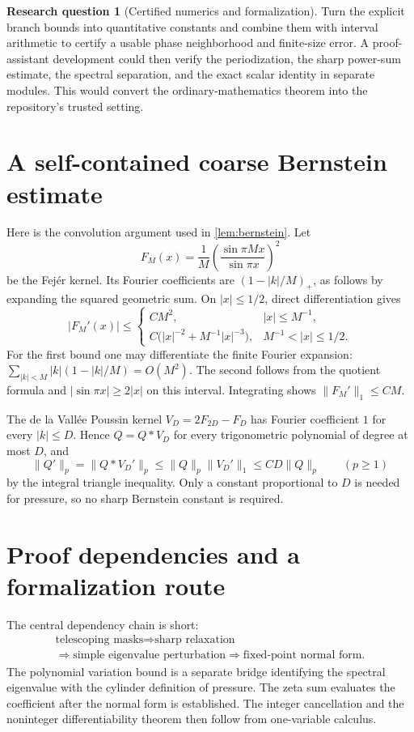 \documentclass[11pt,a4paper]{article}
\numberwithin{equation}{section}
\theoremstyle{definition}
\newtheorem{question}{Research question}
\theoremstyle{remark}
\begin{document}
\begin{question}[Certified numerics and formalization]
Turn the explicit branch bounds into quantitative constants and combine
them with interval arithmetic to certify a usable phase neighborhood and
finite-size error. A proof-assistant development could then verify the
periodization, the sharp power-sum estimate, the spectral separation,
and the exact scalar identity in separate modules. This would convert
the ordinary-mathematics theorem into the repository's trusted setting.
\end{question}

\appendix
\section{A self-contained coarse Bernstein estimate}
\label{app:bernstein}
Here is the convolution argument used in \cref{lem:bernstein}. Let
\[
 F_M(x)=\frac1M\left(\frac{\sin\pi Mx}{\sin\pi x}\right)^2
\]
be the Fej\'er kernel. Its Fourier coefficients are
$(1-|k|/M)_+$, as follows by expanding the squared geometric sum. On
$|x|\le1/2$, direct differentiation gives
\begin{equation}
 |F_M'(x)|\le
 \begin{cases}
 CM^2,&|x|\le M^{-1},\\
 C\bigl(|x|^{-2}+M^{-1}|x|^{-3}\bigr),&M^{-1}<|x|\le1/2.
 \end{cases}
 \label{eq:Fejer-derivative}
\end{equation}
For the first bound one may differentiate the finite Fourier expansion:
$\sum_{|k|<M}|k|(1-|k|/M)=O(M^2)$. The second follows from the quotient
formula and $|\sin\pi x|\ge2|x|$ on this interval. Integrating shows
$\|F_M'\|_1\le CM$.

The de la Vall\'ee Poussin kernel $V_D=2F_{2D}-F_D$ has Fourier
coefficient $1$ for every $|k|\le D$. Hence $Q=Q*V_D$ for every
trigonometric polynomial of degree at most $D$, and
\[
 \|Q'\|_p=\|Q*V_D'\|_p
 \le\|Q\|_p\|V_D'\|_1\le CD\|Q\|_p\qquad(p\ge1)
\]
by the integral triangle inequality. Only a constant proportional to
$D$ is needed for pressure, so no sharp Bernstein constant is required.

\section{Proof dependencies and a formalization route}
\label{app:dependencies}
The central dependency chain is short:
\[
 \begin{gathered}
 \text{telescoping masks}
 \Longrightarrow\text{sharp relaxation}\\[2pt]
 \Longrightarrow\text{simple eigenvalue perturbation}
 \Longrightarrow\text{fixed-point normal form}.
 \end{gathered}
\]
The polynomial variation bound is a separate bridge identifying the
spectral eigenvalue with the cylinder definition of pressure. The zeta
sum evaluates the coefficient after the normal form is established.
The integer cancellation and the noninteger differentiability theorem
then follow from one-variable calculus.
\end{document}
